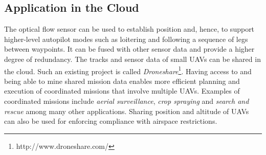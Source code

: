 \documentclass[paper=letter, fontsize=11pt]{scrartcl}
\numberwithin{equation}{section}
\numberwithin{figure}{section}
\numberwithin{table}{section}
\begin{document}
\subsection{Application in the Cloud}
\label{sec:application_cloud}
\par
The optical flow sensor can be used to establish position and, hence, to
support higher-level autopilot modes such as loitering and following a
sequence of legs between waypoints. It can be fused with other sensor data
and provide a higher degree of redundancy. The tracks and sensor data of
small \acp{UAV} can be shared in the cloud. Such an existing project is
called {\em Droneshare}\footnote{http://www.droneshare.com/}. Having access
to and being able to mine shared mission data enables more
efficient planning and execution of coordinated missions that involve
multiple \acp{UAV}. Examples of coordinated missions include {\em aerial
surveillance}, {\em crop spraying} and {\em search and rescue} among many
other applications. Sharing position and altitude of \acp{UAV} can also
be used for enforcing compliance with airspace restrictions.

\clearpage
\label{appendix}


\clearpage
\label{bibliography}


\end{document}
